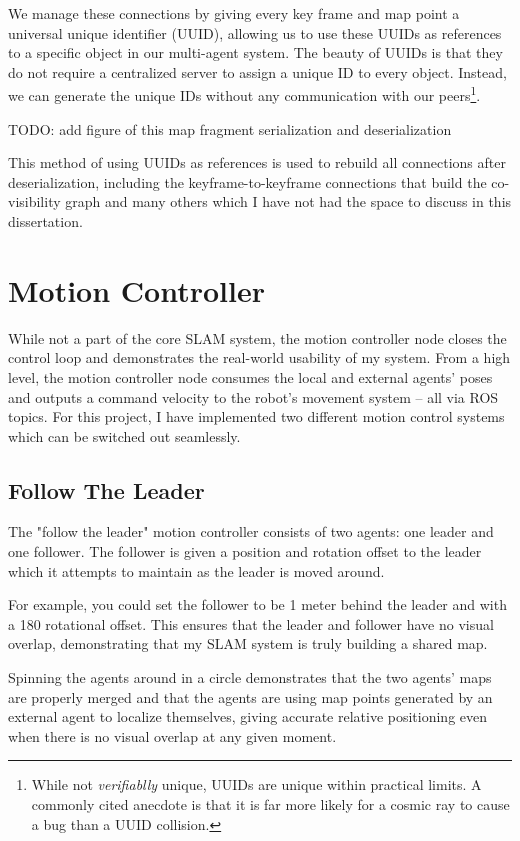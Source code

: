 We manage these connections by giving every key frame and map point a universal unique identifier (UUID), allowing us to use these UUIDs as references to a specific object in our multi-agent system. The beauty of UUIDs is that they do not require a centralized server to assign a unique ID to every object. Instead, we can generate the unique IDs without any communication with our peers\footnote[1]{While not \textit{verifiablly} unique, UUIDs are unique within practical limits. A commonly cited anecdote is that it is far more likely for a cosmic ray to cause a bug than a UUID collision.}.

TODO: add figure of this map fragment serialization and deserialization

This method of using UUIDs as references is used to rebuild all connections after deserialization, including the keyframe-to-keyframe connections that build the co-visibility graph and many others which I have not had the space to discuss in this dissertation.

\section{Motion Controller}
\label{sec:motion-controller}
While not a part of the core SLAM system, the motion controller node closes the control loop and demonstrates the real-world usability of my system. From a high level, the motion controller node consumes the local and external agents' poses and outputs a command velocity to the robot's movement system – all via ROS topics. For this project, I have implemented two different motion control systems which can be switched out seamlessly.

\subsection{Follow The Leader}
\label{sec:follow-the-leader}
The "follow the leader" motion controller consists of two agents: one leader and one follower. The follower is given a position and rotation offset to the leader which it attempts to maintain as the leader is moved around.

For example, you could set the follower to be 1 meter behind the leader and with a 180\textdegree{} rotational offset. This ensures that the leader and follower have no visual overlap, demonstrating that my SLAM system is truly building a shared map.

Spinning the agents around in a circle demonstrates that the two agents' maps are properly merged and that the agents are using map points generated by an external agent to localize themselves, giving accurate relative positioning even when there is no visual overlap at any given moment.

